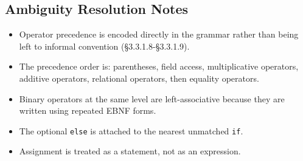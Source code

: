 \documentclass[11pt]{article}
\begin{document}
\subsection*{Ambiguity Resolution Notes}
\begin{itemize}[leftmargin=1.5em]
\item Operator precedence is encoded directly in the grammar rather than being left to informal convention (\S3.3.1.8-\S3.3.1.9).
\item The precedence order is: parentheses, field access, multiplicative operators, additive operators, relational operators, then equality operators.
\item Binary operators at the same level are left-associative because they are written using repeated EBNF forms.
\item The optional \texttt{else} is attached to the nearest unmatched \texttt{if}.
\item Assignment is treated as a statement, not as an expression.
\end{itemize}
\end{document}
